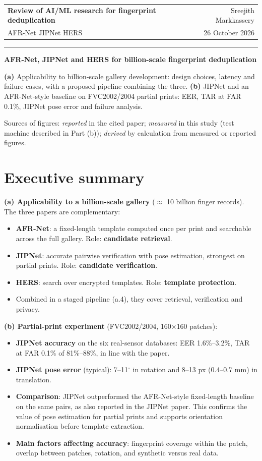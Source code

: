 \documentclass[10pt,a4paper]{article}
\begin{document}
\noindent\begin{tabularx}{\textwidth}{@{}X r@{}}\textbf{Review of AI/ML research for fingerprint deduplication} & Sreejith Markkassery\\ AFR-Net \textperiodcentered{} JIPNet \textperiodcentered{} HERS & 26 October 2026\end{tabularx}\par\vspace{-2pt}\rule{\textwidth}{1pt}
{\LARGE\bfseries AFR-Net, JIPNet and HERS for billion-scale fingerprint deduplication\par}\vspace{4pt}
\textbf{(a)} Applicability to billion-scale gallery development: design choices, latency and failure cases, with a proposed pipeline combining the three. \textbf{(b)} JIPNet and an AFR-Net-style baseline on FVC2002/2004 partial prints: EER, TAR at FAR 0.1\%, JIPNet pose error and failure analysis.

{\footnotesize Sources of figures: \emph{reported} in the cited paper; \emph{measured} in this study (test machine described in Part (b)); \emph{derived} by calculation from measured or reported figures.}

\section*{Executive summary}
\textbf{(a) Applicability to a billion-scale gallery} ($\approx$ 10 billion finger records). The three papers are complementary:
\begin{itemize}
\item \textbf{AFR-Net}: a fixed-length template computed once per print and searchable across the full gallery. Role: \textbf{candidate retrieval}.
\item \textbf{JIPNet}: accurate pairwise verification with pose estimation, strongest on partial prints. Role: \textbf{candidate verification}.
\item \textbf{HERS}: search over encrypted templates. Role: \textbf{template protection}.
\item Combined in a staged pipeline (a.4), they cover retrieval, verification and privacy.
\end{itemize}
\textbf{(b) Partial-print experiment} (FVC2002/2004, 160$\times$160 patches):
\begin{itemize}
\item \textbf{JIPNet accuracy} on the six real-sensor databases: EER 1.6\%--3.2\%, TAR at FAR 0.1\% of 81\%--88\%, in line with the paper.
\item \textbf{JIPNet pose error} (typical): 7--11$^\circ$ in rotation and 8--13 px (0.4--0.7 mm) in translation.
\item \textbf{Comparison}: JIPNet outperformed the AFR-Net-style fixed-length baseline on the same pairs, as also reported in the JIPNet paper. This confirms the value of pose estimation for partial prints and supports orientation normalisation before template extraction.
\item \textbf{Main factors affecting accuracy}: fingerprint coverage within the patch, overlap between patches, rotation, and synthetic versus real data.
\end{itemize}
\end{document}
